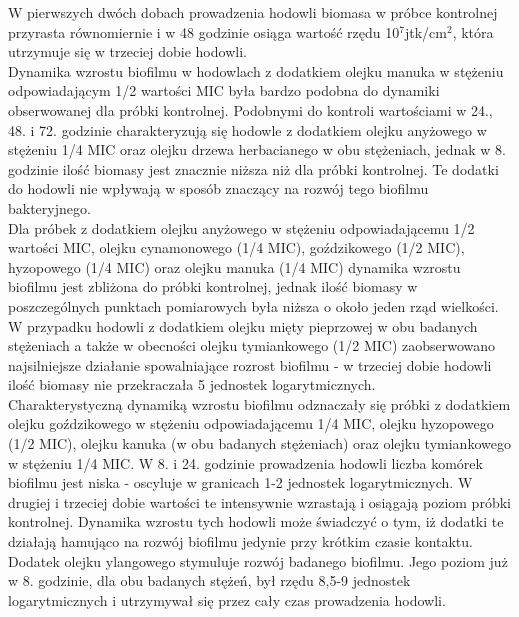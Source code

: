 \documentclass[11pt,a4paper]{report}
\begin{document}
W pierwszych dwóch dobach prowadzenia hodowli biomasa w próbce kontrolnej przyrasta równomiernie i w 48 godzinie osiąga wartość rzędu 10$^7$jtk/cm$^2$, która utrzymuje się w trzeciej dobie hodowli.\\
Dynamika wzrostu biofilmu w hodowlach z dodatkiem olejku manuka w stężeniu odpowiadającym 1/2 wartości MIC była bardzo podobna do dynamiki obserwowanej dla próbki kontrolnej. Podobnymi do kontroli wartościami w 24., 48. i 72. godzinie charakteryzują się hodowle z dodatkiem olejku anyżowego w stężeniu 1/4 MIC oraz olejku drzewa herbacianego w obu stężeniach, jednak w 8. godzinie ilość biomasy jest znacznie niższa niż dla próbki kontrolnej.
Te dodatki do hodowli nie wpływają w sposób znaczący na rozwój tego biofilmu bakteryjnego.\\
Dla próbek z dodatkiem olejku anyżowego w stężeniu odpowiadającemu 1/2 wartości MIC, olejku cynamonowego (1/4 MIC), goździkowego (1/2 MIC), hyzopowego (1/4 MIC) oraz olejku manuka (1/4 MIC) dynamika wzrostu biofilmu jest zbliżona do próbki kontrolnej, jednak ilość biomasy w poszczególnych punktach pomiarowych była niższa o około jeden rząd wielkości.\\
W przypadku hodowli z dodatkiem olejku mięty pieprzowej w obu badanych stężeniach a także w obecności olejku tymiankowego (1/2 MIC) zaobserwowano najsilniejsze działanie spowalniające rozrost biofilmu - w trzeciej dobie hodowli ilość biomasy nie przekraczała 5 jednostek logarytmicznych.\\
Charakterystyczną dynamiką wzrostu biofilmu odznaczały się próbki z dodatkiem olejku goździkowego w stężeniu odpowiadającemu 1/4 MIC, olejku hyzopowego (1/2 MIC), olejku kanuka (w obu badanych stężeniach) oraz olejku tymiankowego w stężeniu 1/4 MIC. W 8. i 24. godzinie prowadzenia hodowli liczba komórek biofilmu jest niska - oscyluje w granicach 1-2 jednostek logarytmicznych. W drugiej i trzeciej dobie wartości te intensywnie wzrastają i osiągają poziom próbki kontrolnej. Dynamika wzrostu tych hodowli może świadczyć o tym, iż dodatki te działają hamująco na rozwój biofilmu jedynie przy krótkim czasie kontaktu.\\
Dodatek olejku ylangowego stymuluje rozwój badanego biofilmu. Jego poziom już w 8. godzinie, dla obu badanych stężeń, był rzędu 8,5-9 jednostek logarytmicznych i utrzymywał się przez cały czas prowadzenia hodowli.
\end{document}
